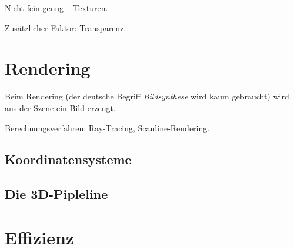 \label{texturing}
Nicht fein genug -- Texturen.

Zusätzlicher Faktor: Transparenz.

\section{Rendering}
Beim Rendering (der deutsche Begriff \emph{Bildsynthese} wird kaum gebraucht) wird aus der Szene ein Bild erzeugt.

Berechnungsverfahren: Ray-Tracing, Scanline-Rendering.

\subsection{Koordinatensysteme}
\subsection{Die 3D-Pipleline}
\label{direct3dopengl}

\section{Effizienz}
\label{performance}
